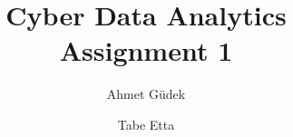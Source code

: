 \documentclass{article}
\begin{document}
\title{Cyber Data Analytics \\Assignment 1}

\author{Ahmet G{\"u}dek\and Tabe Etta}

\maketitle





\end{document}
